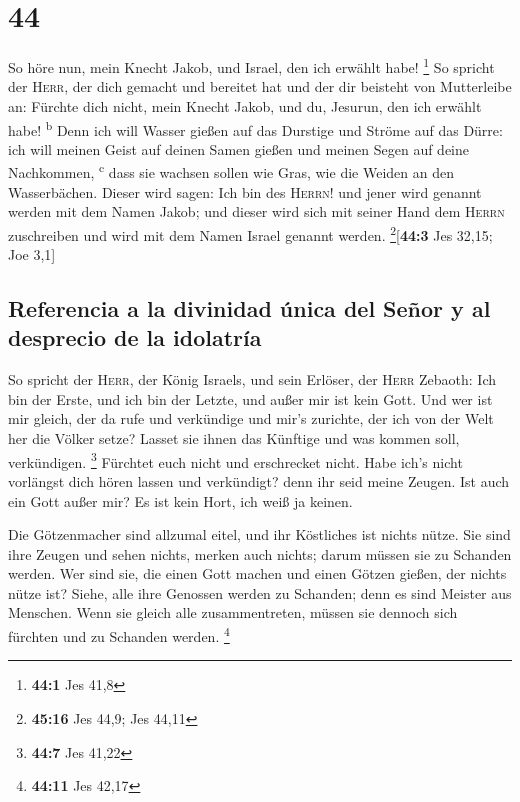 \hypertarget{section-43}{%
\section{44}\label{section-43}}

 So höre nun, mein Knecht Jakob, und Israel, den ich
erwählt habe! \footnote{\textbf{44:1} Jes 41,8}  So
spricht der \textsc{Herr}, der dich gemacht und bereitet hat und der dir
beisteht von Mutterleibe an: Fürchte dich nicht, mein Knecht Jakob, und
du, Jesurun, den ich erwählt habe! \textsuperscript{b} 
Denn ich will Wasser gießen auf das Durstige und Ströme auf das Dürre:
ich will meinen Geist auf deinen Samen gießen und meinen Segen auf deine
Nachkommen, \textsuperscript{c}  dass sie wachsen sollen
wie Gras, wie die Weiden an den Wasserbächen.  Dieser wird
sagen: Ich bin des \textsc{Herrn}! und jener wird genannt werden mit dem
Namen Jakob; und dieser wird sich mit seiner Hand dem \textsc{Herrn}
zuschreiben und wird mit dem Namen Israel genannt werden.
\footnote{\textbf{45:16} Jes 44,9; Jes 44,11}{[}\textbf{44:3} Jes 32,15;
Joe 3,1{]}

\hypertarget{referencia-a-la-divinidad-uxfanica-del-seuxf1or-y-al-desprecio-de-la-idolatruxeda}{%
\subsection{Referencia a la divinidad única del Señor y al desprecio de
la
idolatría}\label{referencia-a-la-divinidad-uxfanica-del-seuxf1or-y-al-desprecio-de-la-idolatruxeda}}

 So spricht der \textsc{Herr}, der König Israels, und sein
Erlöser, der \textsc{Herr} Zebaoth: Ich bin der Erste, und ich bin der
Letzte, und außer mir ist kein Gott.  Und wer ist mir
gleich, der da rufe und verkündige und mir's zurichte, der ich von der
Welt her die Völker setze? Lasset sie ihnen das Künftige und was kommen
soll, verkündigen. \footnote{\textbf{44:7} Jes 41,22} 
Fürchtet euch nicht und erschrecket nicht. Habe ich's nicht vorlängst
dich hören lassen und verkündigt? denn ihr seid meine Zeugen. Ist auch
ein Gott außer mir? Es ist kein Hort, ich weiß ja keinen.

 Die Götzenmacher sind allzumal eitel, und ihr Köstliches
ist nichts nütze. Sie sind ihre Zeugen und sehen nichts, merken auch
nichts; darum müssen sie zu Schanden werden.  Wer sind
sie, die einen Gott machen und einen Götzen gießen, der nichts nütze
ist?  Siehe, alle ihre Genossen werden zu Schanden; denn
es sind Meister aus Menschen. Wenn sie gleich alle zusammentreten,
müssen sie dennoch sich fürchten und zu Schanden werden. \footnote{\textbf{44:11}
  Jes 42,17}

